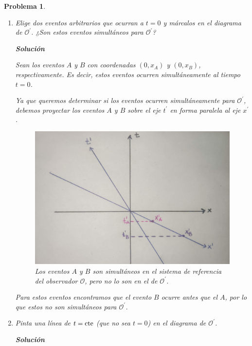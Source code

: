 \documentclass[12pt]{article}
\theoremstyle{break}
\newtheorem{exercise}{Problema}
\theoremstyle{nonumberbreak}
\newcommand*{\observer}{\mathcal{O}}
\newcommand*{\primeobserver}{\mathcal{O}^{\prime}}
\newcommand*{\inlinesol}{\vspace*{10pt}\textbf{Solución}\vspace*{10pt}}
\begin{document}
\begin{exercise}
\begin{enumerate}[label = \alph*)]
            \item Elige dos eventos arbitrarios que ocurran a \(t = 0\) y márcalos en el diagrama de \(\primeobserver\). ¿Son estos eventos simultáneos para \(\primeobserver\)?
            
            \inlinesol
            
            Sean los eventos \(A\) y \(B\) con coordenadas \((0, x_{A})\) y \((0, x_{B})\), respectivamente. Es decir, estos eventos ocurren simultáneamente al tiempo \(t = 0\).

            Ya que queremos determinar si los eventos ocurren simultáneamente para \(\primeobserver\), debemos proyectar los eventos \(A\) y \(B\) sobre el eje \(t^{\prime}\) en forma paralela al eje \(x^{\prime}\).

            \begin{figure}[htb]
                \centering
                \includegraphics[scale = 0.18]{fig-3}
                \caption{Los eventos \(A\) y \(B\) son simultáneos en el sistema de referencia del observador \(\observer\), pero no lo son en el de \(\primeobserver\).}
                \label{fig:events-simultainety}
            \end{figure}

            Para estos eventos encontramos que el evento \(B\) ocurre antes que el \(A\), por lo que estos no son simultáneos para \(\primeobserver\).

            \item Pinta una línea de \(t = \textnormal{cte}\) (que no sea \(t = 0\)) en  el diagrama de \(\primeobserver\).
            
            \inlinesol


\end{enumerate}
\end{exercise}
\end{document}
